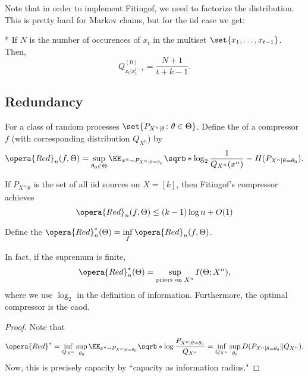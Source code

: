 Note that in order to implement Fitingof, we need to factorize the distribution. This is pretty hard for Markov chains, but for the iid case we get: 

\begin{fact}*
	If $N$ is the number of occurences of $x_t$ in the multiset $\set{x_1,\ldots, x_{t-1}}$. Then, \[
		Q_{x_t|x_1^{t-1}}^{(0)} = \frac{N+1}{t+k-1}.
	\]
\end{fact}

\subsection{Redundancy}

\begin{defn}
	For a class of random processes $\set{P_{X^n|\theta}\colon \theta\in \Theta}$. Define the  of a compressor $f$ (with corresponding distribution $Q_{X^n}$) by \[
		\opera{Red}_n(f, \Theta) = \sup_{\theta_0\in \Theta} \EE_{x^n\sim P_{X^n|\theta = \theta_0}} \sqrb*{\log_2 \frac{1}{Q_{X^n}(x^n)}} - H(P_{X^n|\theta = \theta_0}).
	\]
\end{defn}

\begin{cor}
	If $P_{X^n|\theta}$ is the set of all iid sources on $X = [k]$, then Fitingof's compressor achieves \[
		\opera{Red}_n(f,\Theta) \leq (k-1)\log n + O(1)
	\]
\end{cor}

\begin{defn}
	Define the  $\opera{Red}_n^* (\Theta) = \inf\limits_f \opera{Red}_n (f,\Theta)$.
\end{defn}

\begin{thm}
	In fact, if the supremum is finite, \[
		\opera{Red}_n^*(\Theta) = \sup_{\text{priors on } X^n} I(\Theta; X^n),
	\]
	where we use $\log_2$ in the definition of information. Furthermore, the optimal compressor is the caod.
\end{thm}

\begin{proof}
	Note that \[
		\opera{Red}^* = \inf_{Q_{X^n}} \sup_{\theta_0} \EE_{x^n\sim P_{X^n|\theta = \theta_0}}\sqrb*{\log \frac{P_{X^n|\theta=\theta_0}}{Q_{X^n}}} = \inf_{Q_{X^n}} \sup_{\theta_0} D(P_{X^n|\theta=\theta_0} \Vert Q_{X^n}).
	\]
	Now, this is precisely capacity by ``capacity as information radius."
\end{proof}

